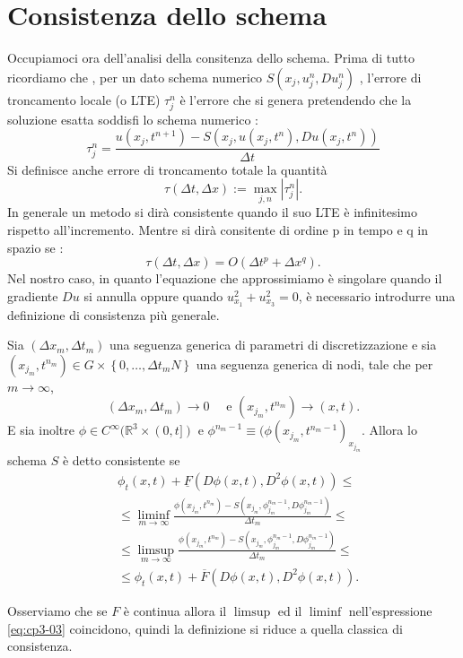 %
\section{Consistenza dello schema}
Occupiamoci ora dell'analisi della consitenza dello schema. Prima di tutto ricordiamo che , per un dato schema numerico $S(x_j,u_j^n,Du_j^n)$ , l'errore di troncamento locale (o LTE) $\tau_j^n$ è l'errore che si genera pretendendo che la soluzione esatta soddisfi lo schema numerico :
\[
\tau_j^n=\frac{u(x_j,t^{n+1})-S(x_j,u(x_j,t^n),Du(x_j,t^n))}{\Delta t}
\]
Si definisce anche errore di troncamento totale la quantità
\[
\tau(\Delta t,\Delta x) := \max_{j,n} |\tau_j^n|.
\]
In generale un metodo si dirà consistente quando il suo LTE è infinitesimo rispetto all'incremento. Mentre si dirà consitente di ordine p in tempo e q in spazio se :
\[
\tau(\Delta t,\Delta x) = O(\Delta t^p +\Delta x^q).
\] 
Nel nostro caso, in quanto l'equazione che approssimiamo è singolare quando il gradiente  $Du$ si annulla oppure quando $u_{x_1}^2+u_{x_3}^2=0$, è necessario introdurre una definizione di consistenza più generale.
\begin{definizione}
Sia $(\Delta x_m,\Delta t_m)$ una seguenza generica di parametri di discretizzazione e sia $(x_{j_m},t^{n_m})\in G\times\left\{0,\dots,\Delta t_mN\right\}$ una seguenza generica di nodi, tale che per $m\to\infty$,
\[
(\Delta x_m,\Delta t_m)\to0 \quad\text{ e } (x_{j_m},t^{n_m})\to(x,t).
\]
E sia inoltre $\phi\in C^{\infty}(\mathbb{R}^3\times(0,t])$ e $\phi^{n_m-1}\equiv(\phi(x_{j_m},t^{n_m-1})_{x_{j_m}}$. Allora lo schema $S$ è detto consistente se
\begin{equation}
\label{eq:cp3-03}
\begin{split}
&\phi_t(x,t)+\underline{F}(D\phi(x,t),D^2\phi(x,t))\le \\
&\le\liminf_{m\to\infty}\frac{\phi(x_{j_m},t^{n_m})-S(x_{j_m},\phi_{j_m}^{n_m-1},D\phi_{j_m}^{n_m-1})}{\Delta t_m}\le \\
&\le\limsup_{m\to\infty}\frac{\phi(x_{j_m},t^{n_m})-S(x_{j_m},\phi_{j_m}^{n_m-1},D\phi_{j_m}^{n_m-1})}{\Delta t_m}\le \\
&\le\phi_t(x,t)+\overline{F}(D\phi(x,t),D^2\phi(x,t)).
\end{split}
\end{equation}
\end{definizione}
\begin{osservazione}
Osserviamo che se $F$ è continua allora il $\limsup$ ed il $\liminf$ nell'espressione \eqref{eq:cp3-03} coincidono, quindi la definizione si riduce a quella classica di consistenza.
\end{osservazione}

